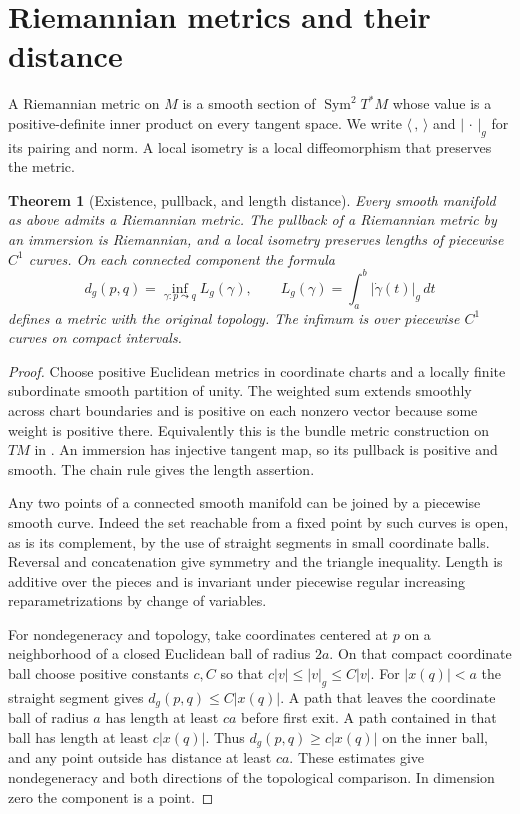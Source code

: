 \documentclass[11pt,oneside,openany]{book}
\theoremstyle{plain}
\newtheorem{theorem}{Theorem}[chapter]
\theoremstyle{definition}
\theoremstyle{remark}
\begin{document}
\section{Riemannian metrics and their distance}\label{p202:G01}

A Riemannian metric on \(M\) is a smooth section of
\(\operatorname{Sym}^2T^*M\) whose value is a positive-definite inner
product on every tangent space. We write \(\langle\, ,\,\rangle\)
and \(\lvert\,\cdot\,\rvert_g\) for its pairing and norm.
A local isometry is a local diffeomorphism that preserves the metric.

\begin{theorem}[Existence, pullback, and length distance]
\label{thm:p202-metric-distance}
Every smooth manifold as above admits a Riemannian metric. The
pullback of a Riemannian metric by an immersion is Riemannian, and a
local isometry preserves lengths of piecewise \(C^1\) curves.
On each connected component the formula
\[
 d_g(p,q)=\inf_{\gamma:p\leadsto q}L_g(\gamma),\qquad
 L_g(\gamma)=\int_a^b\lvert\dot\gamma(t)\rvert_g\,dt
\]
defines a metric with the original topology. The infimum is over
piecewise \(C^1\) curves on compact intervals.
\end{theorem}

\begin{proof}
Choose positive Euclidean metrics in coordinate charts and a locally
finite subordinate smooth partition of unity. The weighted sum extends
smoothly across chart boundaries and is positive on each nonzero vector
because some weight is positive there. Equivalently this is the bundle
metric construction on \(TM\) in \cite[Chapter 5]{P104}.
An immersion has injective tangent map, so its pullback is positive
and smooth. The chain rule gives the length assertion.

Any two points of a connected smooth manifold can be joined by a
piecewise smooth curve. Indeed the set reachable from a fixed point
by such curves is open, as is its complement, by the use of straight
segments in small coordinate balls. Reversal and concatenation
give symmetry and the triangle inequality. Length is additive over
the pieces and is invariant under piecewise regular increasing
reparametrizations by change of variables.

For nondegeneracy and topology, take coordinates centered at \(p\)
on a neighborhood of a closed Euclidean ball of radius \(2a\).
On that compact coordinate ball choose positive constants \(c,C\)
so that \(c\lvert v\rvert\leq\lvert v\rvert_g\leq C\lvert v\rvert\).
For \(\lvert x(q)\rvert<a\) the straight segment gives
\(d_g(p,q)\leq C\lvert x(q)\rvert\). A path that leaves the
coordinate ball of radius \(a\) has length at least \(ca\) before
first exit. A path contained in that ball has length at least
\(c\lvert x(q)\rvert\). Thus \(d_g(p,q)\geq c\lvert x(q)\rvert\)
on the inner ball, and any point outside has distance at least \(ca\).
These estimates give nondegeneracy and both directions of the
topological comparison. In dimension zero the component is a point.
\end{proof}
\end{document}
